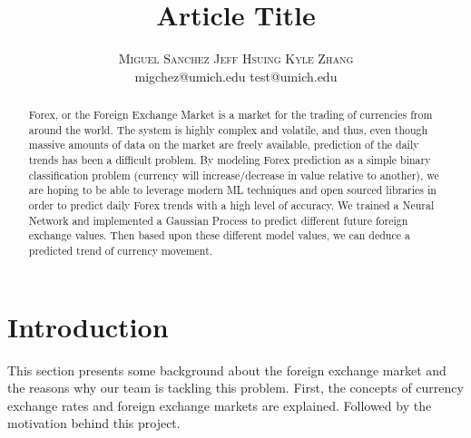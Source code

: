 \documentclass[twoside]{article}
\title{\vspace{-15mm}\fontsize{24pt}{10pt}\selectfont\textbf{Article Title}} %
\author{
\large
\textsc{Miguel Sanchez Jeff Hsuing Kyle Zhang}\\
\normalsize migchez@umich.edu test@umich.edu %
\vspace{-5mm}
}
\date{}
\begin{document}
\maketitle %


\begin{abstract}

Forex, or the Foreign Exchange Market is a market for the trading of currencies from around the world. The system is highly complex and volatile, and thus, even though massive amounts of data on the market are freely available, prediction of the daily trends has been a difficult problem. By modeling Forex prediction as a simple binary classification problem (currency will increase/decrease in value relative to another), we are hoping to be able to leverage modern ML techniques and open sourced libraries in order to predict daily Forex trends with a high level of accuracy. We trained a Neural Network and implemented a Gaussian Process to predict different future foreign exchange values. Then based upon these different model values, we can deduce a predicted trend of currency movement.


\end{abstract}


\section{Introduction}

This section presents some background about the foreign exchange market and the reasons why our team is tackling this problem. First, the concepts of currency exchange rates and foreign exchange markets are explained. Followed by the motivation behind this project.
\end{document}
